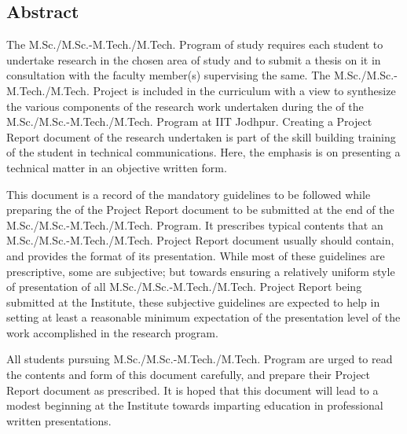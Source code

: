 \myemptypage
\begin{flushright}
\huge{\section*{Abstract}}
\end{flushright}
The M.Sc./M.Sc.-M.Tech./M.Tech. Program of study requires each student to undertake research in the  chosen area of study and to submit a thesis on it in consultation with the faculty member(s) supervising the same. The M.Sc./M.Sc.-M.Tech./M.Tech. Project is included in the curriculum with a view to synthesize the various components of the research work undertaken during the of the M.Sc./M.Sc.-M.Tech./M.Tech. Program at IIT Jodhpur. Creating a Project Report document of the research undertaken is part of the skill building training of the student in technical communications. Here, the emphasis is on presenting a technical matter in an objective written form.

This document is a record of the mandatory guidelines to be followed while preparing the of the Project Report document to be submitted at the end of the M.Sc./M.Sc.-M.Tech./M.Tech. Program. It prescribes typical contents that an M.Sc./M.Sc.-M.Tech./M.Tech. Project Report document usually should contain, and provides the format of its presentation. While most of these guidelines are prescriptive, some are subjective; but towards ensuring a relatively uniform style of presentation of all M.Sc./M.Sc.-M.Tech./M.Tech. Project Report being submitted at the Institute, these subjective guidelines are expected to help in setting at least a reasonable minimum expectation of the presentation level of the work accomplished in the research program.

All students pursuing M.Sc./M.Sc.-M.Tech./M.Tech. Program are urged to read the contents and form of this document carefully, and prepare their Project Report document as prescribed. It is hoped that this document will lead to a modest beginning at the Institute towards imparting education in professional written presentations.

